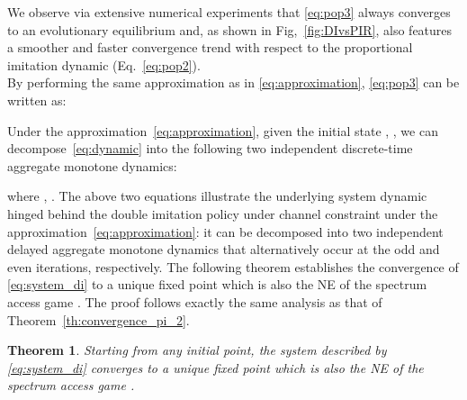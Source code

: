 \documentclass[12pt, onecolumn]{IEEEtran}
\theoremstyle{plain}
\newtheorem{theorem}{Theorem}
\theoremstyle{definition}
\begin{document}
\begin{comment}

\begin{figure*}
\begin{minipage}[r]{0.49\linewidth}
\texttt{[image: DIvsAPPROX.eps]}
\caption{System dynamic and its approximation by double aggregate monotone dynamic.}
\label{fig:DIvsAPPROX}
\end{minipage} \hfill
\begin{minipage}[c]{0.49\linewidth}
\texttt{[image: PIRvsDI\_NO\_approx.eps]}
\caption{Double dynamic compared to the proportional dynamic.}
\label{fig:DIvsPIR}
\end{minipage}\hfill
\vspace{0.5cm}
\end{figure*}

\end{comment}


We observe via extensive numerical experiments that \eqref{eq:pop3} always converges to an evolutionary equilibrium and, as shown in Fig,~\ref{fig:DIvsPIR}, also
features a smoother and faster convergence trend with respect to the proportional imitation dynamic (Eq.~\eqref{eq:pop2}).\\
By performing the same approximation as in \eqref{eq:approximation},
\eqref{eq:pop3} can be written as:



Under the approximation~\eqref{eq:approximation}, given the initial state , , we can decompose~\eqref{eq:dynamic} into the following two independent discrete-time aggregate monotone dynamics:

where , . The above two equations illustrate the underlying system dynamic hinged behind the double imitation policy under channel constraint under the approximation~\eqref{eq:approximation}: it can be decomposed into two independent delayed aggregate monotone dynamics that alternatively occur at the odd and even iterations, respectively. The following theorem establishes the convergence of \eqref{eq:system_di} to a unique fixed point which is also the NE of the spectrum access game . The proof follows exactly the same analysis as that of Theorem~\ref{th:convergence_pi_2}.

\begin{theorem}
Starting from any initial point, the system described by \eqref{eq:system_di} converges to a unique fixed point which is also the NE of the spectrum access game .
\label{th:convergence_di_2}
\end{theorem}
\end{document}
